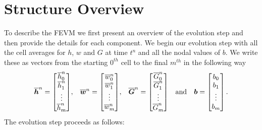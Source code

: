 \section{Structure Overview}
\label{sec:StructOverview}
To describe the FEVM we first present an overview of the evolution step and then provide the details for each component. We begin our evolution step with all the cell averages for $h$, $w$ and $G$ at time $t^n$ and all the nodal values of $b$. We write these as vectors from the starting $0^{th}$ cell to the final $m^{th}$ in the following way
\begin{align*} \overline{\boldsymbol{h}}^n = \begin{bmatrix}
\overline{h}_0^n \\\overline{h}_1^n \\ \vdots \\ \overline{h}_m^n \end{bmatrix} &,& \overline{\boldsymbol{w}}^n = \begin{bmatrix}
\overline{w}_0^n \\\overline{w}_1^n \\ \vdots \\ \overline{w}_m^n \end{bmatrix} &,&  \overline{\boldsymbol{G}}^n = \begin{bmatrix}
\overline{G}_0^n \\\overline{G}_1^n \\ \vdots \\ \overline{G}_m^n \end{bmatrix}& &\text{and}& & \boldsymbol{b} = \begin{bmatrix}
b_{0} \\ b_{1} \\ \vdots \\b_{m}
\end{bmatrix}. \\
\end{align*}
The evolution step proceeds as follows:
